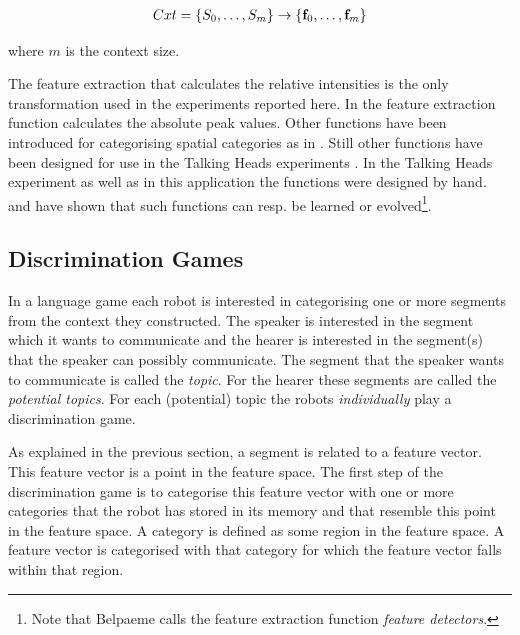 \begin{eqnarray}
Cxt=\{S_0,\ldots,S_m\} \rightarrow \{{\bf f}_0,\ldots,{\bf f}_m\}
\end{eqnarray}


where $m$ is the context size.

The feature extraction that calculates the relative intensities is the only transformation used in the experiments reported here. In \citep{steelsvogt:1997,vogt:1998b} the feature extraction function calculates the absolute peak values. Other functions have been introduced for categorising spatial categories as in \citep{steels:1996d}. Still other functions have been designed for use in the Talking Heads experiments \citep{belpaeme:1998,steelskaplan:1999}. In the Talking Heads experiment as well as in this application the functions were designed by hand. \citet{dejong:1999} and \citet{belpaeme:1999} have shown that such functions can resp. be learned or evolved\footnote{Note that Belpaeme calls the feature extraction function {\em feature detectors}.}.


\subsection{Discrimination Games}\label{s:cm:dg}



In a language game each robot is interested in categorising one or more segments from the context they constructed. The speaker is interested in the segment which it wants to communicate and the hearer is interested in the segment(s) that the speaker can possibly communicate. The segment that the speaker wants to communicate is called the {\em topic}. For the hearer these segments are called the {\em potential topics}. For each (potential) topic the robots {\em individually} play a discrimination game.

As explained in the previous section, a segment is related to a feature vector. This feature vector is a point in the feature space. The first step of the discrimination game is to categorise this feature vector with one or more categories that the robot has stored in its memory and that resemble this point in the feature space. A category is defined as some region in the feature space. A feature vector is categorised with that category for which the feature vector falls within that region.

